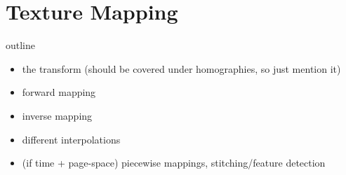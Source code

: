 \section{Texture Mapping} 
outline
\begin{itemize}
	\item the transform (should be covered under homographies, so just
	mention it)
	\item forward mapping
	\item inverse mapping
	\item different interpolations
	\item (if time + page-space) piecewise mappings, stitching/feature detection
\end{itemize}
